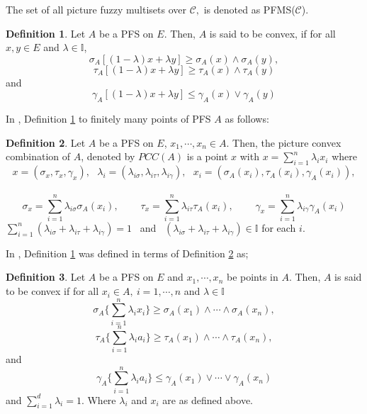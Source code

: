 \documentclass[12pt,letterpaper]{amsart}
\theoremstyle{plain}
\theoremstyle{definition}
\newtheorem{definition}{Definition}[section]
\numberwithin{equation}{section}
\begin{document}
\noindent The set of all picture fuzzy multisets over $\mathcal{C},$ is denoted as PFMS($\mathcal{C}$).

\begin{definition} \cite{s1} \label{1}
Let $A$ be a PFS on $E$. Then, $A$ is said to be convex, if for all $x, y \in E$ and $\lambda \in \mathbb{I}$,
$$ \sigma_{A} [(1 - \lambda)x + \lambda y] \geq \sigma_{A}(x) \wedge \sigma_{A}(y),$$ $$\tau_{A} [(1 - \lambda)x + \lambda y] \geq \tau_{A}(x) \wedge \tau_{A}(y)$$ and $$\gamma_{A}[(1 - \lambda)x + \lambda y] \leq \gamma_{A}(x) \vee \gamma_{A}(y)$$
\end{definition}

\noindent In \cite{s1}, Definition \ref{1} to finitely many points of PFS $A$ as follows:

\begin{definition}  \cite{s1} \label{2}
Let $A$ be a PFS on $E$, $x_1, \cdots, x_{n} \in A$. Then, the picture convex combination of $A$, denoted by $PCC(A)$ is a point $x$ with $x = \sum \limits_{i=1}^{n} \lambda_{i} x_i$ where $$x = (\sigma_x, \tau_x, \gamma_x ),~~~ \lambda_i = (\lambda_{i \sigma}, \lambda_{i \tau}, \lambda_{i \gamma} ),~~~ x_i = ( \sigma_{A}(x_i), \tau_{A}(x_i), \gamma_{A}(x_i) ),$$~~~ $$\sigma_x = \sum \limits_{i=1}^{n} \lambda_{i \sigma} \sigma_{A}(x_i), ~~~~~~~~~~ \tau_x = \sum \limits_{i=1}^{n} \lambda_{i \tau} \tau_{A}(x_i),~~~~~~~~~~ \gamma_x = \sum \limits_{i=1}^{n} \lambda_{i \gamma} \gamma_{A}(x_i)$$  $\sum \limits_{i=1}^{n} (\lambda_{i \sigma} + \lambda_{i \tau} + \lambda_{i \gamma}) = 1$~ and~ $ (\lambda_{i \sigma} + \lambda_{i \tau} + \lambda_{i \gamma}) \in \mathbb{I}$ for each $i$.
\end{definition}

\noindent In \cite{s1}, Definition \ref{1} was defined in terms of Definition \ref{2} as;

\begin{definition}  \cite{s1}
Let $A$ be a PFS on $E$ and $x_1, \cdots, x_{n}$ be points in $A$. Then, $A$ is said to be convex if for all $x_{i} \in A,~ i = 1, \cdots, n$ and $\lambda \in \mathbb{I}$ $$\sigma_A \{ \sum \limits_{i=1}^{n} \lambda_{i} x_i \} \geq \sigma_{A}(x_1) \wedge \cdots \wedge \sigma_{A}(x_n),$$ $$\tau_A \{ \sum \limits_{i=1}^{n} \lambda_{i} a_i \} \geq \tau_{A}(x_1) \wedge \cdots \wedge \tau_{A}(x_n),$$ and $$\gamma_A \{ \sum \limits_{i=1}^{n} \lambda_{i} a_i \} \leq \gamma_{A}(x_1) \vee \cdots \vee \gamma_{A}(x_n)$$ and $\sum \limits_{i=1}^{d} \lambda_i = 1$. Where $\lambda_i$ and $x_i$ are as defined above.
\end{definition}
\end{document}
